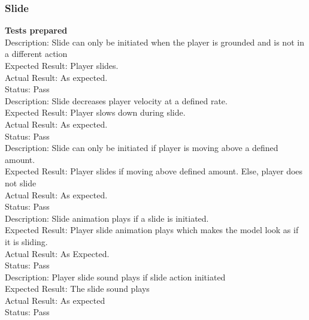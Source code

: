 \documentclass[11pt,a4paper]{article}
\begin{document}
\subsubsection{Slide}
\textbf{Tests prepared}\\
Description: Slide can only be initiated when the player is grounded and is not in a different action\\
Expected Result: Player slides.\\
Actual Result: As expected.\\
Status: Pass
\smallskip\\
Description: Slide decreases player velocity at a defined rate. \\
Expected Result: Player slows down during slide.\\
Actual Result: As expected.\\
Status: Pass
\smallskip\\
Description: Slide can only be initiated if player is moving above a defined amount. \\
Expected Result: Player slides if moving above defined amount. Else, player does not slide\\
Actual Result: As expected.\\
Status: Pass
\smallskip\\
Description: Slide animation plays if a slide is initiated. \\
Expected Result: Player slide animation plays which makes the model look as if it is sliding.\\
Actual Result: As Expected.\\
Status: Pass
\smallskip\\
Description: Player slide sound plays if slide action initiated\\
Expected Result: The slide sound plays\\
Actual Result:  As expected\\
Status: Pass
\end{document}
